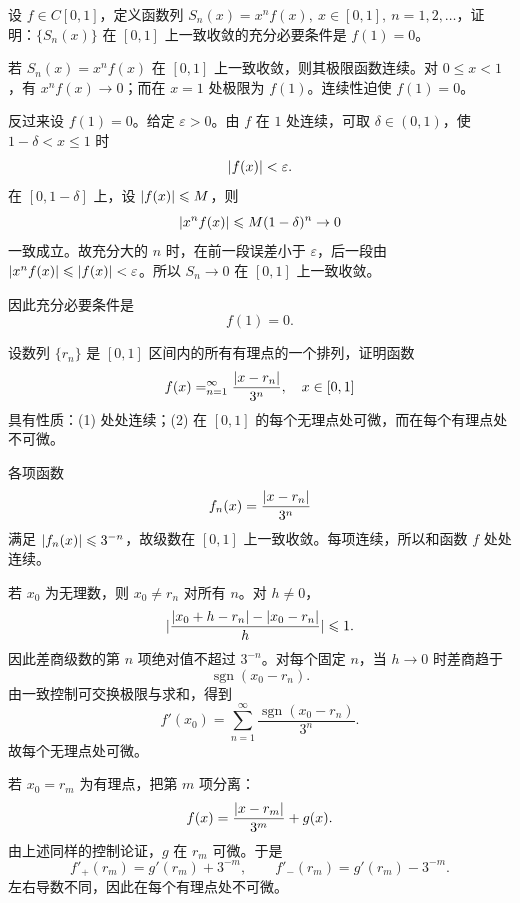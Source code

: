 \begin{xreferenceproblem}[4]
设 $f\in C[0,1]$，定义函数列 $S_n(x)=x^nf(x),\ x\in[0,1],\ n=1,2,\ldots$，证明：$\{S_n(x)\}$ 在 $[0,1]$ 上一致收敛的充分必要条件是 $f(1)=0$。
\end{xreferenceproblem}
\begin{xsolution}
若 $S_n(x)=x^nf(x)$ 在 $[0,1]$ 上一致收敛，则其极限函数连续。对 $0\leqslant x<1$，有 $x^nf(x)\to0$；而在 $x=1$ 处极限为 $f(1)$。连续性迫使 $f(1)=0$。

反过来设 $f(1)=0$。给定 $\varepsilon>0$。由 $f$ 在 $1$ 处连续，可取 $\delta\in(0,1)$，使 $1-\delta<x\leqslant1$ 时
\[
  \lvert f(x)\rvert<\varepsilon.
\]
在 $[0,1-\delta]$ 上，设 $\lvert f(x)\rvert\leqslant M$，则
\[
  \lvert x^nf(x)\rvert\leqslant M(1-\delta)^n\to0
\]
一致成立。故充分大的 $n$ 时，在前一段误差小于 $\varepsilon$，后一段由 $\lvert x^nf(x)\rvert\leqslant\lvert f(x)\rvert<\varepsilon$。所以 $S_n\to0$ 在 $[0,1]$ 上一致收敛。

因此充分必要条件是
\[
  \boxed{f(1)=0}.
\]
\end{xsolution}


\begin{xreferenceproblem}[5]
设数列 $\{r_n\}$ 是 $[0,1]$ 区间内的所有有理点的一个排列，证明函数
  \[
    f(x)=\relax_{n=1}^{\infty}\frac{\lvert x-r_n\rvert}{3^n},\quad x\in[0,1]
  \]
  具有性质：(1) 处处连续；(2) 在 $[0,1]$ 的每个无理点处可微，而在每个有理点处不可微。
\end{xreferenceproblem}
\begin{xsolution}
各项函数
\[
  f_n(x)=\frac{\lvert x-r_n\rvert}{3^n}
\]
满足 $\lvert f_n(x)\rvert\leqslant3^{-n}$，故级数在 $[0,1]$ 上一致收敛。每项连续，所以和函数 $f$ 处处连续。

若 $x_0$ 为无理数，则 $x_0\ne r_n$ 对所有 $n$。对 $h\ne0$，
\[
  \lvert
  \frac{\lvert x_0+h-r_n\rvert-\lvert x_0-r_n\rvert}h\rvert
  \leqslant1.
\]
因此差商级数的第 $n$ 项绝对值不超过 $3^{-n}$。对每个固定 $n$，当 $h\to0$ 时差商趋于
\[
  \operatorname{sgn}(x_0-r_n).
\]
由一致控制可交换极限与求和，得到
\[
  f'(x_0)=\sum_{n=1}^{\infty}
  \frac{\operatorname{sgn}(x_0-r_n)}{3^n}.
\]
故每个无理点处可微。

若 $x_0=r_m$ 为有理点，把第 $m$ 项分离：
\[
  f(x)=\frac{\lvert x-r_m\rvert}{3^m}+g(x).
\]
由上述同样的控制论证，$g$ 在 $r_m$ 可微。于是
\[
  f'_+(r_m)=g'(r_m)+3^{-m},
  \qquad
  f'_-(r_m)=g'(r_m)-3^{-m}.
\]
左右导数不同，因此在每个有理点处不可微。
\end{xsolution}


